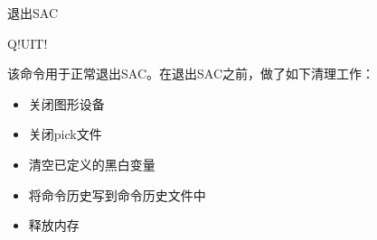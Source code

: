 \label{cmd:quit}

退出SAC

\begin{SACSTX}
Q!UIT!
\end{SACSTX}

该命令用于正常退出SAC。在退出SAC之前，做了如下清理工作：
\begin{itemize}
\item 关闭图形设备
\item 关闭pick文件
\item 清空已定义的黑白变量
\item 将命令历史写到命令历史文件中
\item 释放内存
\end{itemize}
